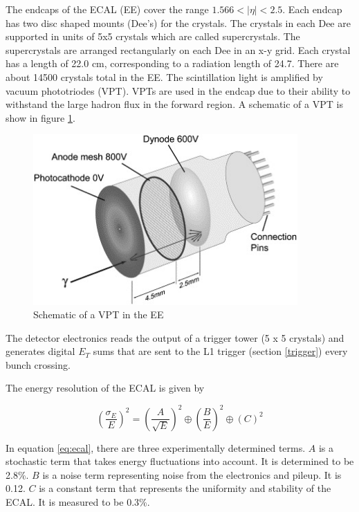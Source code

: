 \documentclass[oneside, letterpaper, oldfontcommands]{memoir}
\begin{document}

\qquad The endcaps of the ECAL (EE) cover the range $1.566 < |\eta| < 2.5$. Each endcap has two disc shaped mounts (Dee's) for the crystals. The crystals in each Dee are supported in units of 5x5 crystals which are called supercrystals. The supercrystals are arranged rectangularly on each Dee in an x-y grid. Each crystal has a length of 22.0 cm, corresponding to a radiation length of 24.7. There are about 14500 crystals total in the EE. The scintillation light is amplified by vacuum phototriodes (VPT). VPTs are used in the endcap due to their ability to withstand the large hadron flux in the forward region. A schematic of a VPT is show in figure \ref{fig:VPT}.

\begin{figure}[here]
\includegraphics[width=0.9\textwidth]{vpt.jpg}
\caption{Schematic of a VPT in the EE  \cite{Brown:2007cg}}
\label{fig:VPT}
\end{figure}

\qquad The detector electronics reads the output of a trigger tower (5 x 5 crystals) and generates digital $E_{T}$ sums that are sent to the L1 trigger (section \ref{trigger}) every bunch crossing.

\qquad The energy resolution of the ECAL is given by 

\begin{equation}
\label{eq:ecal}
\left(\frac{\sigma_{E}}{E}\right)^{2} = \left(\frac{A}{\sqrt{E}}\right)^{2} \oplus \left(\frac{B}{E}\right)^{2} \oplus \left( C \right)^{2}
\end{equation} 


In equation \ref{eq:ecal}, there are three experimentally determined terms. $A$ is a stochastic term that takes energy fluctuations into account. It is determined to be 2.8\%. $B$ is a noise term representing noise from the electronics and pileup. It is 0.12. $C$ is a constant term that represents the uniformity and stability of the ECAL. It is measured to be 0.3\%. 
\end{document}
